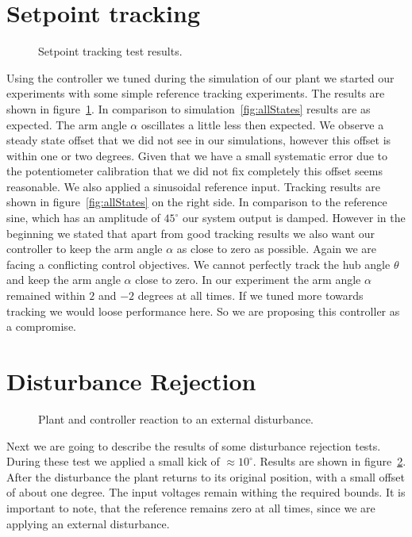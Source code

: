 \documentclass[ twoside,openright,titlepage,numbers=noenddot,headinclude,%
                footinclude=true,cleardoublepage=empty,abstractoff, %
                BCOR=5mm,paper=a4,fontsize=11pt,%
                ngerman,american,%
                ]{scrreprt}
\begin{document}
{{\section{Setpoint tracking}
\begin{figure}


\caption{Setpoint tracking test results.}
\label{fig:setPoint}
\end{figure}
Using the controller we tuned during the simulation of our plant we started our experiments with some simple reference tracking experiments. The results are shown in figure~\ref{fig:setPoint}. In comparison to simulation~\ref{fig:allStates} results are as expected. The arm angle $\alpha$ oscillates a little less then expected. We observe a steady state offset that we did not see in our simulations, however this offset is within one or two degrees. Given that we have a small systematic error due to the potentiometer calibration that we did not fix completely this offset seems reasonable. We also applied a sinusoidal reference input. Tracking results are shown in figure~\ref{fig:allStates} on the right side. In comparison to the reference sine, which has an amplitude of $45^\circ$ our system output is damped. However in the beginning we stated that apart from good tracking results we also want our controller to keep the arm angle $\alpha$ as close to zero as possible. Again we are facing a conflicting control objectives. We cannot perfectly track the hub angle $\theta$ and keep the arm angle $\alpha$ close to zero. In our experiment the arm angle $\alpha$ remained within $2$ and $-2$ degrees at all times. If we tuned more towards tracking we would loose performance here. So we are proposing this controller as a compromise. 

\section{Disturbance Rejection}
\begin{figure}

\caption{Plant and controller reaction to an external disturbance.}
\label{fig:disturbance}
\end{figure}
Next we are going to describe the results of some disturbance rejection tests. During these test we applied a small kick of $\approx 10^\circ$. Results are shown in figure~\ref{fig:disturbance}. After the disturbance the plant returns to its original position, with a small offset of about one degree. The input voltages remain withing the required bounds. It is important to note, that the reference remains zero at all times, since we are applying an external disturbance.

}}
\end{document}
